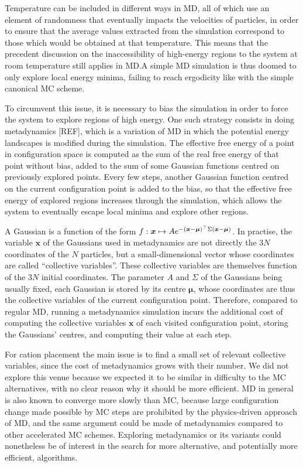 \documentclass[main.tex]{subfiles}
\begin{document}
Temperature can be included in different ways in MD, all of which use an element of randomness that eventually impacts the velocities of particles, in order to ensure that the average values extracted from the simulation correspond to those which would be obtained at that temperature. This means that the precedent discussion on the inaccessibility of high-energy regions to the system at room temperature still applies in MD.\@ A simple MD simulation is thus doomed to only explore local energy minima, failing to reach ergodicity like with the simple canonical MC scheme.

To circumvent this issue, it is necessary to bias the simulation in order to force the system to explore regions of high energy. One such strategy consists in doing metadynamics [REF], which is a variation of MD in which the potential energy landscapes is modified during the simulation. The effective free energy of a point in configuration space is computed as the sum of the real free energy of that point without bias, added to the sum of some Gaussian functions centred on previously explored points. Every few steps, another Gaussian function centred on the current configuration point is added to the bias, so that the effective free energy of explored regions increases through the simulation, which allows the system to eventually escape local minima and explore other regions.

A Gaussian is a function of the form $f:\boldsymbol x\mapsto Ae^{-\left(\boldsymbol x - \boldsymbol\mu\right)^\top\Sigma\left(\boldsymbol x - \boldsymbol\mu\right)}$. In practise, the variable $\boldsymbol x$ of the Gaussians used in metadynamics are not directly the $3N$ coordinates of the $N$ particles, but a small-dimensional vector whose coordinates are called ``collective variables''. These collective variables are themselves function of the $3N$ initial coordinates. The parameter $A$ and $\Sigma$ of the Gaussians being usually fixed, each Gaussian is stored by its centre $\boldsymbol\mu$, whose coordinates are thus the collective variables of the current configuration point. Therefore, compared to regular MD, running a metadynamics simulation incurs the additional cost of computing the collective variables $\boldsymbol x$ of each visited configuration point, storing the Gaussians' centres, and computing their value at each step.

For cation placement the main issue is to find a small set of relevant collective variables, since the cost of metadynamics grows with their number. We did not explore this venue because we expected it to be similar in difficulty to the MC alternatives, with no clear reason why it should be more efficient. MD in general is also known to converge more slowly than MC, because large configuration change made possible by MC steps are prohibited by the physics-driven approach of MD, and the same argument could be made of metadynamics compared to other accelerated MC schemes. Exploring metadynamics or its variants could nonetheless be of interest in the search for more alternative, and potentially more efficient, algorithms.

\OnlyInSubfile{\printglobalbibliography}
\end{document}
